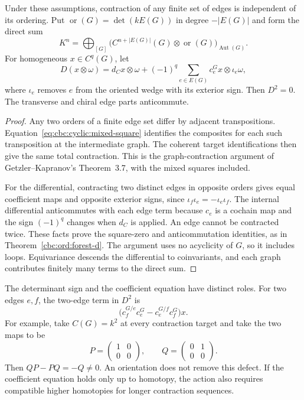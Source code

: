 \begin{proposition}\label{cbc:cyclic:mixed}
Under these assumptions, contraction of any finite set of edges is independent of its ordering.
Put $\operatorname{or}(G)=\det(kE(G))$ in degree $-|E(G)|$ and form the direct sum
\[
 K^n=\bigoplus_{[G]}
 \bigl(C^{n+|E(G)|}(G)\otimes\operatorname{or}(G)\bigr)_{\operatorname{Aut}(G)}.
\]
For homogeneous $x\in C^q(G)$, let
\[
 D(x\otimes\omega)=d_Cx\otimes\omega
       +(-1)^q\sum_{e\in E(G)}c_e^Gx\otimes\iota_e\omega,
\]
where $\iota_e$ removes $e$ from the oriented wedge with its exterior sign.
Then $D^2=0$.
The transverse and chiral edge parts anticommute.
\end{proposition}
\begin{proof}
Any two orders of a finite edge set differ by adjacent transpositions.
Equation~\eqref{eq:cbc:cyclic:mixed-square} identifies the composites for each such transposition at the intermediate graph.
The coherent target identifications then give the same total contraction.
This is the graph-contraction argument of Getzler--Kapranov's Theorem~3.7, with the mixed squares included.

For the differential, contracting two distinct edges in opposite orders gives equal coefficient maps and opposite exterior signs, since $\iota_f\iota_e=-\iota_e\iota_f$.
The internal differential anticommutes with each edge term because $c_e$ is a cochain map and the sign $(-1)^q$ changes when $d_C$ is applied.
An edge cannot be contracted twice.
These facts prove the square-zero and anticommutation identities, as in Theorem~\ref{cbc:ord:forest-d}.
The argument uses no acyclicity of $G$, so it includes loops.
Equivariance descends the differential to coinvariants, and each graph contributes finitely many terms to the direct sum.
\end{proof}

The determinant sign and the coefficient equation have distinct roles.
For two edges $e,f$, the two-edge term in $D^2$ is
\[
 \bigl(c_f^{G/e}c_e^G-c_e^{G/f}c_f^G\bigr)x.
\]
For example, take $C(G)=k^2$ at every contraction target and take the two maps to be
\[
 P=\begin{pmatrix}1&0\\0&0\end{pmatrix},\qquad
 Q=\begin{pmatrix}0&1\\0&0\end{pmatrix}.
\]
Then $QP-PQ=-Q\ne0$.
An orientation does not remove this defect.
If the coefficient equation holds only up to homotopy, the action also requires compatible higher homotopies for longer contraction sequences.

